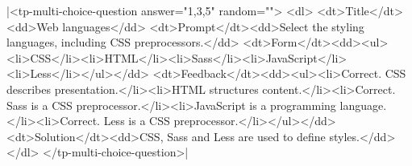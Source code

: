 \documentclass{article}
\begin{document}
\rawhtml|<tp-multi-choice-question answer="1,3,5" random="">
  <dl>
    <dt>Title</dt><dd>Web languages</dd>
    <dt>Prompt</dt><dd>Select the styling languages, including CSS preprocessors.</dd>
    <dt>Form</dt><dd><ul><li>CSS</li><li>HTML</li><li>Sass</li><li>JavaScript</li><li>Less</li></ul></dd>
    <dt>Feedback</dt><dd><ul><li>Correct. CSS describes presentation.</li><li>HTML structures content.</li><li>Correct. Sass is a CSS preprocessor.</li><li>JavaScript is a programming language.</li><li>Correct. Less is a CSS preprocessor.</li></ul></dd>
    <dt>Solution</dt><dd>CSS, Sass and Less are used to define styles.</dd>
  </dl>
</tp-multi-choice-question>|
\end{document}
